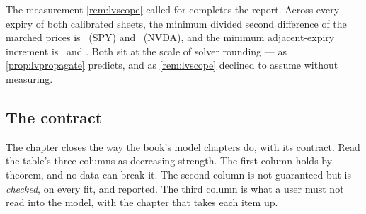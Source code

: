 The measurement \cref{rem:lvscope} called for completes the
report.  Across every expiry of both calibrated sheets, the minimum
divided second difference of the marched prices is
\MacLvSpyButterflyMin\ (SPY) and \MacLvNvdaButterflyMin\ (NVDA), and
the minimum adjacent-expiry increment is \MacLvSpyCalendarMin\ and
\MacLvNvdaCalendarMin.  Both sit at the scale of solver rounding ---
as \cref{prop:lvpropagate} predicts, and as \cref{rem:lvscope}
declined to assume without measuring.

\subsection{The contract}
\label{sec:lvcontract}

The chapter closes the way the book's model chapters do, with its
contract.  Read the table's three columns as decreasing strength.  The
first column holds by theorem, and no data can break it.  The second
column is not guaranteed but is \emph{checked}, on every fit, and
reported.  The third column is what a user must not read into the
model, with the chapter that takes each item up.

